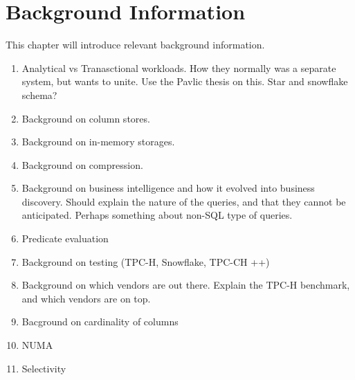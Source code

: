 \chapter{Background Information}
\label{chap:background}
\begin{secex}
This chapter will introduce relevant background information.
\begin{enumerate}
  \item Analytical vs Tranasctional workloads. How they normally was a separate system, but wants to unite. Use the Pavlic thesis on this. Star and snowflake schema?
  \item Background on column stores.
  \item Background on in-memory storages.
  \item Background on compression.
  \item Background on business intelligence and how it evolved into business discovery. Should explain the nature of the queries, and that they cannot be anticipated. Perhaps something about non-SQL type of queries.
  \item Predicate evaluation
  \item Background on testing (TPC-H, Snowflake, TPC-CH ++)
  \item Background on which vendors are out there. Explain the TPC-H benchmark, and which vendors are on top.
  \item Bacground on cardinality of columns
  \item NUMA
  \item Selectivity
\end{enumerate}
\end{secex}
\clearpage




